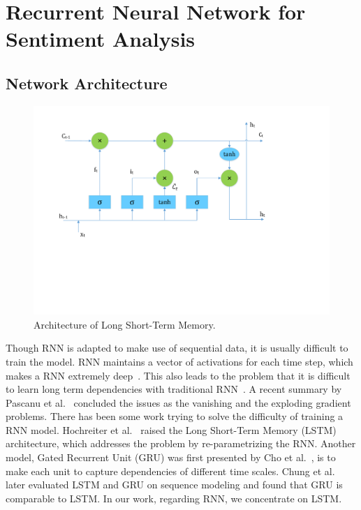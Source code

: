 \section{Recurrent Neural Network for Sentiment Analysis}\label{sec.rnn}

\subsection{Network Architecture}

\begin{figure}
\centering
\includegraphics[scale=0.5]{figure/lstm.pdf}
\caption{Architecture of Long Short-Term Memory.}
\label{fig:lstm}
\end{figure}

Though RNN is adapted to make use of sequential data, it is usually difficult to train the model. RNN maintains a vector of activations for each time step, which makes a RNN extremely deep~\cite{jozefowicz2015}. This also leads to the problem that it is difficult to learn long term dependencies with traditional RNN~\cite{bengio1994}. A recent summary by Pascanu et al.~\cite{pascanu2012} concluded the issues as the vanishing and the exploding gradient problems. There has been some work trying to solve the difficulty of training a RNN model. Hochreiter et al.~\cite{hochreiter1997} raised the Long Short-Term Memory (LSTM) architecture, which addresses the problem by re-parametrizing the RNN. Another model, Gated Recurrent Unit (GRU) was first presented by Cho et al.~\cite{cho2014}, is to make each unit to capture dependencies of different time scales. Chung et al.~\cite{chung2014} later evaluated LSTM and GRU on sequence modeling and found that GRU is comparable to LSTM. In our work, regarding RNN, we concentrate on LSTM.

